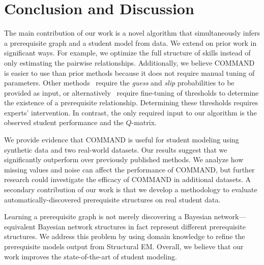 \documentclass{edm_template}
\begin{document}
	\section{Conclusion and Discussion \label{sec:conclusion}}
	The main contribution of our work is a novel algorithm that simultaneously infers a prerequisite graph and a student model from data.
        We  extend  on prior work in significant ways.
	For example, we optimize the full structure of skills instead of only estimating the pairwise relationships. 
	Additionally, we believe COMMAND is easier to use than prior methods because  it does not require  manual tuning of  parameters.
	Other methods~\cite{brunskill2010estimating} require  the  \emph{guess} and \emph{slip} probabilities to be  provided as input,
	or alternatively~\cite{chen2015discovering} require fine-tuning of thresholds to determine the existence of a prerequisite relationship.
	Determining these thresholds requires experts' intervention. 
	In contrast, the only required input to our algorithm is the observed student performance and the $Q$-matrix.
	
	We provide evidence that COMMAND is useful for student modeling using synthetic data  and two real-world datasets.
	Our results suggest that we significantly outperform over previously published methods.
	We analyze how missing values and noise can affect the performance of COMMAND, but further research could investigate the efficacy of COMMAND in additional datasets.  %
	A secondary contribution of our work is that we develop a methodology to evaluate automatically-discovered prerequisite structures on real student data.
	
	Learning a prerequisite graph is not merely discovering a Bayesian network--- 
	   equivalent Bayesian network structures  in fact represent different prerequisite structures.
        We address this problem by using domain knowledge to refine the prerequisite models output from Structural EM.
	Overall, we believe that our work improves the state-of-the-art of student modeling.
	
\end{document}
